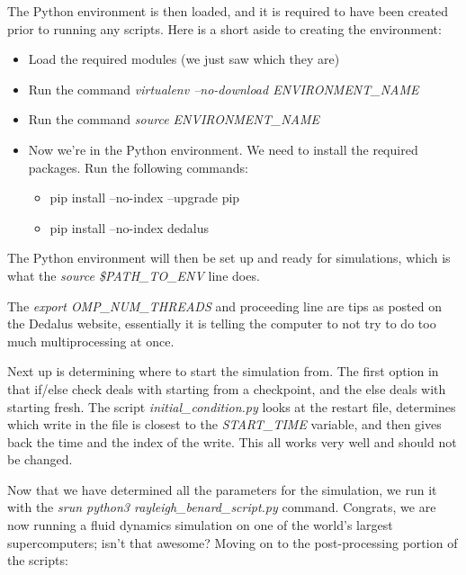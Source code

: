 \documentclass[12pt,a4paper]{report}
\begin{document}
	The Python environment is then loaded, and it is required to have been created prior to running any scripts. Here is a short aside to creating the environment:

	\begin{itemize}
		\item Load the required modules (we just saw which they are)
		\item Run the command \textit{virtualenv --no-download ENVIRONMENT\_NAME}
		\item Run the command \textit{source ENVIRONMENT\_NAME}
		\item Now we're in the Python environment. We need to install the required packages. Run the following commands:
		\begin{itemize}
			\item pip install --no-index --upgrade pip
			\item pip install --no-index dedalus
		\end{itemize}
	\end{itemize}

	The Python environment will then be set up and ready for simulations, which is what the \textit{source \$PATH\_TO\_ENV} line does.

	The \textit{export OMP\_NUM\_THREADS} and proceeding line are tips as posted on the Dedalus website, essentially it is telling the computer to not try to do too much multiprocessing at once.

	Next up is determining where to start the simulation from. The first option in that if/else check deals with starting from a checkpoint, and the else deals with starting fresh. The script \textit{initial\_condition.py} looks at the restart file, determines which write in the file is closest to the \textit{START\_TIME} variable, and then gives back the time and the index of the write. This all works very well and should not be changed.

	Now that we have determined all the parameters for the simulation, we run it with the \textit{srun python3 rayleigh\_benard\_script.py} command. Congrats, we are now running a fluid dynamics simulation on one of the world's largest supercomputers; isn't that awesome? Moving on to the post-processing portion of the scripts:
\end{document}
